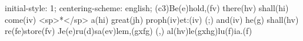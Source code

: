 initial-style: 1;
centering-scheme: english;
(c3)Be(e)hold,(fv) there(hv) shall(hi) come(iv) <sp>*</sp> a(hi) great(jh) proph(iv)et:(iv) (;) and(iv) he(g) shall(hv) re(fe)store(fv) Je(e)ru(d)sa(ev)lem,(gxfg) (,) al(hv)le(gxhg)lu(f)ia.(f)

